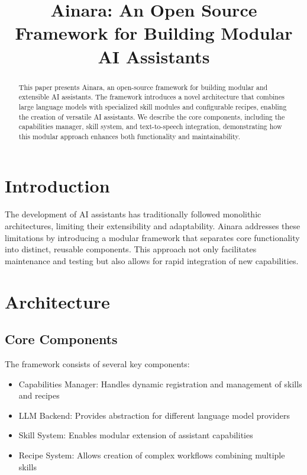 \documentclass[conference]{IEEEtran}
\title{Ainara: An Open Source Framework for Building Modular AI Assistants}
\author{
    \IEEEauthorblockN{Rubén Gómez Agudo}
    \IEEEauthorblockA{Khromalabs et al.\\
    Email: ruben@khromalabs.org}
}
\begin{document}
\maketitle

\begin{abstract}
This paper presents Ainara, an open-source framework for building modular and extensible AI assistants. The framework introduces a novel architecture that combines large language models with specialized skill modules and configurable recipes, enabling the creation of versatile AI assistants. We describe the core components, including the capabilities manager, skill system, and text-to-speech integration, demonstrating how this modular approach enhances both functionality and maintainability.
\end{abstract}

\section{Introduction}
The development of AI assistants has traditionally followed monolithic architectures, limiting their extensibility and adaptability. Ainara addresses these limitations by introducing a modular framework that separates core functionality into distinct, reusable components. This approach not only facilitates maintenance and testing but also allows for rapid integration of new capabilities.

\section{Architecture}
\subsection{Core Components}
The framework consists of several key components:
\begin{itemize}
    \item Capabilities Manager: Handles dynamic registration and management of skills and recipes
    \item LLM Backend: Provides abstraction for different language model providers
    \item Skill System: Enables modular extension of assistant capabilities
    \item Recipe System: Allows creation of complex workflows combining multiple skills
\end{itemize}
\end{document}
